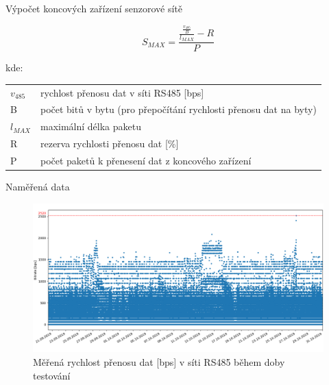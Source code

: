 \documentclass{beamer}
\begin{document}
\begin{frame}{Výpočet koncových zařízení senzorové sítě}


	\begin{equation}
		S_{MAX} = \frac{\frac{\frac{v_{485}}{B}}{l_{MAX}} - R}{P}
		\end{equation}
		
	\fontsize{10}{12}\selectfont 

		kde:
		
		\begin{tabular}{l @{  } l}
		$v_{485}$ & rychlost přenosu dat v síti RS485 [bps]\\
		B        & počet bitů v bytu (pro přepočítání rychlosti přenosu dat na byty) \\
		$l_{MAX}$ & maximální délka paketu \\
		R        & rezerva rychlosti přenosu dat [\%]\\
		P        & počet paketů k přenesení dat z koncového zařízení \\
	\end{tabular}

\end{frame}



\begin{frame} {Naměřená data}

	\begin{figure}[!h]
		\centering
		\includegraphics[width=1\textwidth]{03-dr-measured}
		\caption{Měřená rychlost přenosu dat [bps] v síti RS485 během doby testování}
	\end{figure}

\end{frame}
\end{document}
